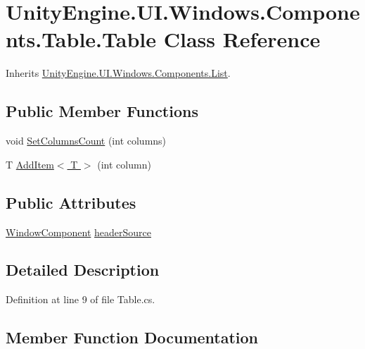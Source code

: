 \hypertarget{class_unity_engine_1_1_u_i_1_1_windows_1_1_components_1_1_table_1_1_table}{}\section{Unity\+Engine.\+U\+I.\+Windows.\+Components.\+Table.\+Table Class Reference}
\label{class_unity_engine_1_1_u_i_1_1_windows_1_1_components_1_1_table_1_1_table}


Inherits \hyperlink{class_unity_engine_1_1_u_i_1_1_windows_1_1_components_1_1_list}{Unity\+Engine.\+U\+I.\+Windows.\+Components.\+List}.

\subsection*{Public Member Functions}
\begin{DoxyCompactItemize}
\item 
void \hyperlink{class_unity_engine_1_1_u_i_1_1_windows_1_1_components_1_1_table_1_1_table_a247cdbef30a5bd2baeba222d2c60d99a}{Set\+Columns\+Count} (int columns)
\item 
T \hyperlink{class_unity_engine_1_1_u_i_1_1_windows_1_1_components_1_1_table_1_1_table_adb87c649f351c3e05a059bbadc254847}{Add\+Item$<$ T $>$} (int column)
\end{DoxyCompactItemize}
\subsection*{Public Attributes}
\begin{DoxyCompactItemize}
\item 
\hyperlink{class_unity_engine_1_1_u_i_1_1_windows_1_1_window_component}{Window\+Component} \hyperlink{class_unity_engine_1_1_u_i_1_1_windows_1_1_components_1_1_table_1_1_table_ab480689b9f751fb9a9dc1f71e7fad8e1}{header\+Source}
\end{DoxyCompactItemize}


\subsection{Detailed Description}


Definition at line 9 of file Table.\+cs.



\subsection{Member Function Documentation}
\hypertarget{class_unity_engine_1_1_u_i_1_1_windows_1_1_components_1_1_table_1_1_table_adb87c649f351c3e05a059bbadc254847}{}
